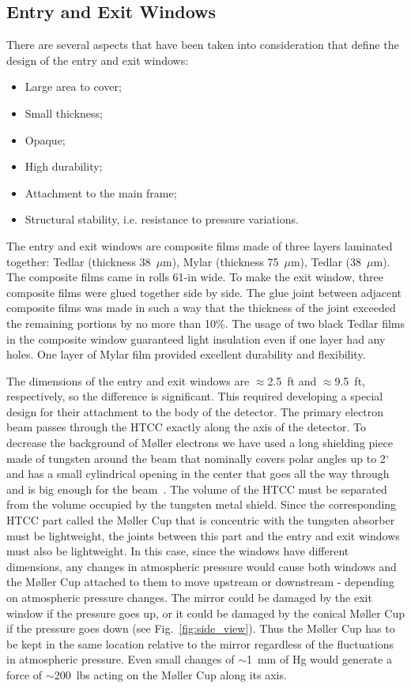 \subsection {Entry and Exit Windows}

There are several aspects that have been taken into consideration that define the design of the entry and
exit windows:

\begin{itemize}
    \item Large area to cover;
    \item Small thickness;
    \item Opaque;
    \item High durability;
    \item Attachment to the main frame;
    \item Structural stability, i.e. resistance to pressure variations.
    \end{itemize}

The entry and exit windows are composite films made of three layers laminated together: Tedlar (thickness
38~$\mu$m), Mylar (thickness 75~$\mu$m), Tedlar (38~$\mu$m). The composite films came in rolls 61-in
wide. To make the exit window, three composite films were glued together side by side. The glue joint between
adjacent composite films was made in such a way that the thickness of the joint exceeded the remaining portions
by no more than 10\%. The usage of two black Tedlar films in the composite window guaranteed light insulation
even if one layer had any holes. One layer of Mylar film provided excellent durability and flexibility.

The dimensions of the entry and exit windows are $\approx$2.5~ft and $\approx$9.5~ft, respectively, so the
difference is significant. This required developing a special design for their attachment to the body of the
detector. The primary electron beam passes through the HTCC exactly along the axis of the detector. To
decrease the background of M{\o}ller electrons we have used a long shielding piece made of tungsten around
the beam that nominally covers polar angles up to 2$^\circ$ and has a small cylindrical opening in the center that
goes all the way through and is big enough for the beam~\cite{beamline-nim}. The volume of the HTCC must be
separated from the volume occupied by the tungsten metal shield. Since the corresponding HTCC part called the
M{\o}ller Cup that is concentric with the tungsten absorber must be lightweight, the joints between this part
and the entry and exit windows must also be lightweight. In this case, since the windows have different
dimensions, any changes in atmospheric pressure would cause both windows and the M{\o}ller Cup attached to
them to move upstream or downstream - depending on atmospheric pressure changes. The mirror could be
damaged by the exit window if the pressure goes up, or it could be damaged by the conical M{\o}ller Cup if the
pressure goes down (see Fig.~\ref{fig:side_view}). Thus the M{\o}ller Cup has to be kept in the same location
relative to the mirror regardless of the fluctuations in atmospheric pressure. Even small changes of
$\sim$1~mm of Hg would generate a force of $\sim$200~lbs acting on the M{\o}ller Cup along its axis.  

